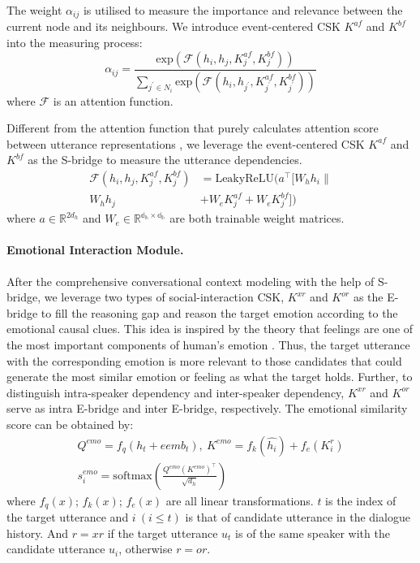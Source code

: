 \documentclass[letterpaper]{article} \usepackage{aaai23}  \usepackage{times}  \usepackage{helvet}  \usepackage{courier}  \usepackage[hyphens]{url}  \usepackage{graphicx} \urlstyle{rm} \def\UrlFont{\rm}  \usepackage{natbib}  \usepackage{caption} \frenchspacing  \setlength{\pdfpagewidth}{8.5in} \setlength{\pdfpageheight}{11in} \usepackage{algorithm}
\begin{document}
The weight $\alpha_{ij}$ is utilised to measure the importance and relevance between the current node and its neighbours. We introduce event-centered CSK $K^{af}$ and $K^{bf}$ into the measuring process:
\begin{equation}
    \alpha_{ij} = \frac{\mathrm{exp}(\mathcal{F}(h_i, h_j, K^{af}_j, K^{bf}_j))}{\sum_{j^{\prime} \in N_i} \mathrm{exp}(\mathcal{F}(h_i, h_{j^{\prime}}, K^{af}_{j^{\prime}}, K^{bf}_{j^{\prime}}))}
\end{equation}
where $\mathcal{F}$ is an attention function.

Different from the attention function that purely calculates attention score between utterance representations \cite{gat}, we leverage the event-centered CSK $K^{af}$ and $K^{bf}$ as the S-bridge to measure the utterance dependencies. 
\begin{equation}
\begin{aligned}
    \mathcal{F}(h_i, h_j, K^{af}_j, K^{bf}_j) &= \mathrm{LeakyReLU}(a^\top [W_h h_i \parallel \\ W_h h_j & + W_e K^{af}_j + W_e K^{bf}_j])
    \end{aligned}
\end{equation}
where $a \in \mathbb{R}^{2d_h}$ and $W_e \in \mathbb{R^{d_h \times d_h}}$ are both trainable weight matrices.

\paragraph{Emotional Interaction Module.}
After the comprehensive conversational context modeling with the help of S-bridge, we leverage two types of social-interaction CSK, $K^{xr}$ and $K^{or}$ as the E-bridge to fill the reasoning gap and reason the target emotion according to the emotional causal clues. This idea is inspired by the theory that feelings are one of the most important components of human's emotion \cite{theory}. Thus, the target utterance with the corresponding emotion is more relevant to those candidates that could generate the most similar emotion or feeling as what the target holds. Further, to distinguish intra-speaker dependency and inter-speaker dependency, $K^{xr}$ and $K^{or}$ serve as intra E-bridge and inter E-bridge, respectively. The emotional similarity score can be obtained by:
\begin{equation}
\begin{aligned}
    Q^{emo} = f_q(h_t + eemb_t), \ K^{emo} = f_k(\hat{h_i}) + f_e(K^{r}_i) \\
    s_i^{emo} = \mathrm{softmax}(\frac{Q^{emo} (K^{emo})^\top}{\sqrt{d_h}})
    \end{aligned}
\end{equation}
where $f_q(x)$; $f_k(x)$; $f_e(x)$ are all linear transformations. $t$ is the index of the target utterance and $i \ (i \le t)$  is that of candidate utterance in the dialogue history. And $r=xr$ if the target utterance $u_t$ is of the same speaker with the candidate utterance $u_i$, otherwise $r=or$.
\end{document}
